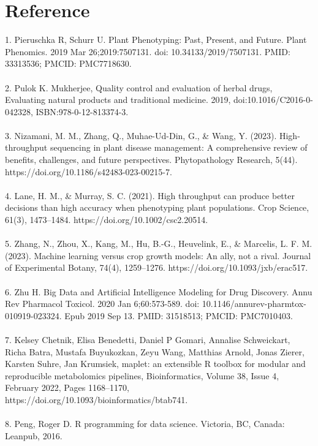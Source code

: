 \documentclass[12pt,a4paper]{report}
\begin{document}
\chapter{Reference}

    
1. Pieruschka R, Schurr U. Plant Phenotyping: Past, Present, and Future. Plant Phenomics. 2019 Mar   26;2019:7507131. doi: 10.34133/2019/7507131. PMID: 33313536; PMCID: PMC7718630. \\
\\
2. Pulok K. Mukherjee, Quality control and evaluation of herbal drugs, Evaluating natural products and traditional medicine. 2019, doi:10.1016/C2016-0-042328, ISBN:978-0-12-813374-3. \\
\\
3. Nizamani, M. M., Zhang, Q., Muhae-Ud-Din, G., \& Wang, Y. (2023). High-throughput sequencing in plant disease management: A comprehensive review of benefits, challenges, and future perspectives. Phytopathology Research, 5(44). https://doi.org/10.1186/s42483-023-00215-7. \\
\\
4. Lane, H. M., \& Murray, S. C. (2021). High throughput can produce better decisions than high accuracy when phenotyping plant populations. Crop Science, 61(3), 1473–1484. https://doi.org/10.1002/csc2.20514. \\
\\
5. Zhang, N., Zhou, X., Kang, M., Hu, B.-G., Heuvelink, E., \& Marcelis, L. F. M. (2023). Machine learning versus crop growth models: An ally, not a rival. Journal of Experimental Botany, 74(4), 1259–1276. https://doi.org/10.1093/jxb/erac517. \\
\\
6. Zhu H. Big Data and Artificial Intelligence Modeling for Drug Discovery. Annu Rev Pharmacol Toxicol. 2020 Jan 6;60:573-589. doi: 10.1146/annurev-pharmtox-010919-023324. Epub 2019 Sep 13. PMID: 31518513; PMCID: PMC7010403. \\
\\
7. Kelsey Chetnik, Elisa Benedetti, Daniel P Gomari, Annalise Schweickart, Richa Batra, Mustafa Buyukozkan, Zeyu Wang, Matthias Arnold, Jonas Zierer, Karsten Suhre, Jan Krumsiek,  maplet: an extensible R toolbox for modular and reproducible metabolomics pipelines, Bioinformatics, Volume 38, Issue 4, February 2022, Pages 1168–1170, https://doi.org/10.1093/bioinformatics/btab741. \\
\\
8. Peng, Roger D. R programming for data science. Victoria, BC, Canada: Leanpub, 2016. \\
\end{document}
